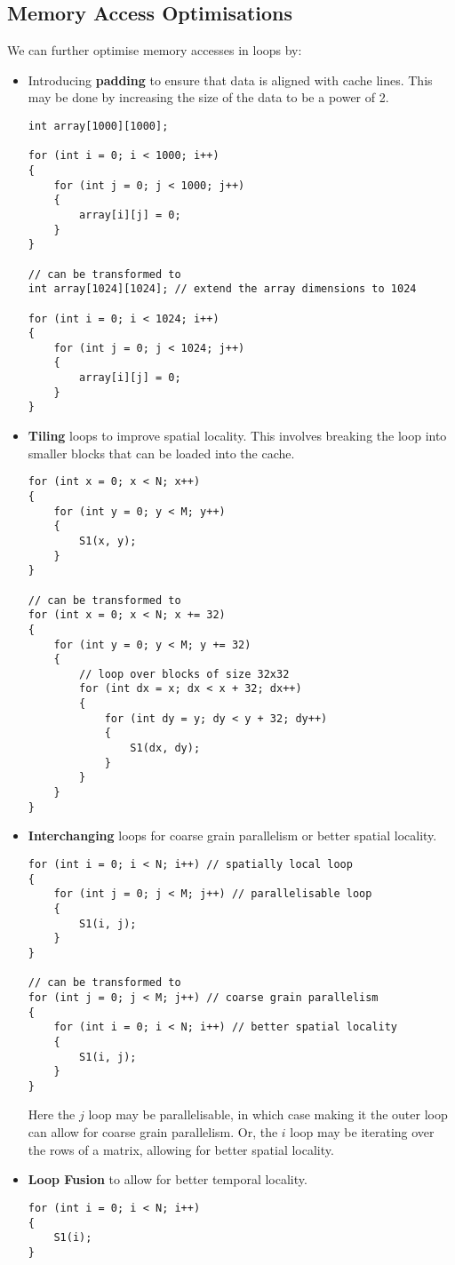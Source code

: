 \documentclass{article}
\begin{document}
\subsection{Memory Access Optimisations}
We can further optimise memory accesses in loops by:
\begin{itemize}
    \item Introducing \textbf{padding} to ensure that data is aligned
          with cache lines. This may be done by increasing the size of
          the data to be a power of 2.
          \begin{verbatim}
int array[1000][1000];

for (int i = 0; i < 1000; i++)
{
    for (int j = 0; j < 1000; j++)
    {
        array[i][j] = 0;
    }
}

// can be transformed to
int array[1024][1024]; // extend the array dimensions to 1024

for (int i = 0; i < 1024; i++)
{
    for (int j = 0; j < 1024; j++)
    {
        array[i][j] = 0;
    }
}
          \end{verbatim}
    \item \textbf{Tiling} loops to improve spatial locality. This involves
          breaking the loop into smaller blocks that can be loaded into
          the cache.
          \begin{verbatim}
for (int x = 0; x < N; x++)
{
    for (int y = 0; y < M; y++)
    {
        S1(x, y);
    }
}

// can be transformed to
for (int x = 0; x < N; x += 32)
{
    for (int y = 0; y < M; y += 32)
    {
        // loop over blocks of size 32x32
        for (int dx = x; dx < x + 32; dx++)
        {
            for (int dy = y; dy < y + 32; dy++)
            {
                S1(dx, dy);
            }
        }
    }
}
\end{verbatim}
    \item \textbf{Interchanging} loops for coarse grain parallelism or
    better spatial locality.
          \begin{verbatim}
for (int i = 0; i < N; i++) // spatially local loop
{
    for (int j = 0; j < M; j++) // parallelisable loop
    {
        S1(i, j);
    }
}

// can be transformed to
for (int j = 0; j < M; j++) // coarse grain parallelism
{
    for (int i = 0; i < N; i++) // better spatial locality
    {
        S1(i, j);
    }
}
\end{verbatim}
    Here the \(j\) loop may be parallelisable, in which case making it
    the outer loop can allow for coarse grain parallelism. Or, the \(i\)
    loop may be iterating over the rows of a matrix, allowing for
    better spatial locality.
    \item \textbf{Loop Fusion} to allow for better temporal locality.
          \begin{verbatim}
for (int i = 0; i < N; i++)
{
    S1(i);
}


\end{verbatim}
\end{itemize}
\end{document}
